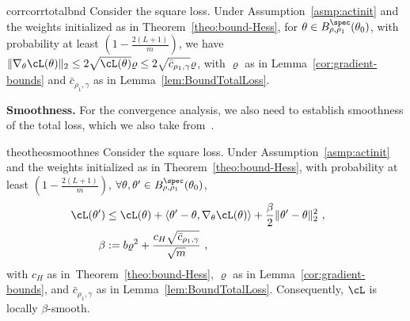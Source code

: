 \begin{restatable}{corr}{corrtotalbnd}
\label{cor:total-bound}
Consider the square loss. Under Assumption~\ref{asmp:actinit}  and the weights initialized as in Theorem~\ref{theo:bound-Hess}, for $\theta \in B_{\rho,\rho_1}^{\spec}(\theta_0)$, with probability at least $\left(1-\frac{2(L+1)}{m}\right)$, we have
$\|\nabla_\theta \cL(\theta)\|_2  \leq 2\sqrt{\cL(\theta)}\varrho\leq 2\sqrt{\bar{c}_{\rho_1,\gamma}}\varrho$,
with $\varrho$ as in Lemma~\ref{cor:gradient-bounds} and $\bar{c}_{\rho_1,\gamma}$ as in Lemma~\ref{lem:BoundTotalLoss}.
\end{restatable}

{\bf Smoothness.} For the convergence analysis, we also need to establish smoothness of the total loss, which we also take from~\citep{AB-PCV-LZ-MB:22}.

\begin{restatable}{theo}{theosmoothnes}
Consider the square loss. Under Assumption~\ref{asmp:actinit} and the weights initialized as in Theorem~\ref{theo:bound-Hess},
with probability at least $(1 - \frac{2(L+1)}{m})$, $\forall \theta,\theta' \in B_{\rho,\rho_1}^{\spec}(\theta_0)$,
%
\begin{equation}
\label{eq:Smooth-formula-NN}
\begin{split}
\hspace*{-5mm} 
\cL(\theta') & \leq \cL(\theta) + \langle \theta'-\theta, \nabla_\theta\cL(\theta) \rangle + \frac{\beta}{2} \| \theta' - \theta \|_2^2~, \\
\beta & := b\varrho^2 + \frac{c_H\sqrt{\bar{c}_{\rho_1,\gamma}}}{\sqrt{m}} ~,
\end{split}
\end{equation}
%
with $c_H$ as in~Theorem~\ref{theo:bound-Hess}, $\varrho$ as in Lemma~\ref{cor:gradient-bounds}, and $\bar{c}_{\rho_1,\gamma}$ as in Lemma~\ref{lem:BoundTotalLoss}. Consequently, $\cL$ is locally $\beta$-smooth.
\label{theo:smoothnes}
\end{restatable}





